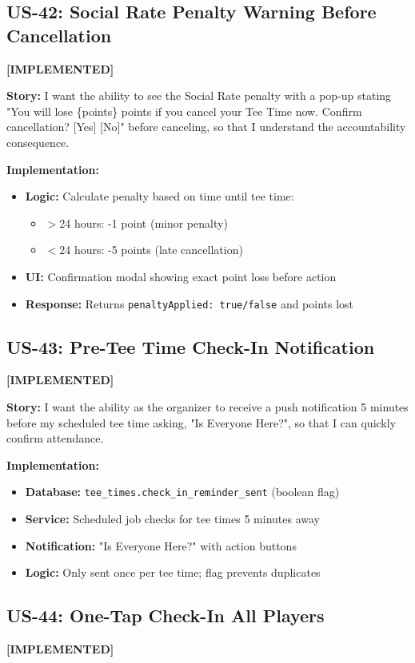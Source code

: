 \documentclass[11pt,a4paper]{article}
\newcommand{\implemented}{\textcolor{implemented}{\textbf{[IMPLEMENTED]}}}
\begin{document}
\subsection{US-42: Social Rate Penalty Warning Before Cancellation}
\implemented

\textbf{Story:} I want the ability to see the Social Rate penalty with a pop-up stating "You will lose \{points\} points if you cancel your Tee Time now. Confirm cancellation? [Yes] [No]" before canceling, so that I understand the accountability consequence.

\textbf{Implementation:}
\begin{itemize}[leftmargin=*]
  \item \textbf{Logic:} Calculate penalty based on time until tee time:
    \begin{itemize}
      \item $>$24 hours: -1 point (minor penalty)
      \item $<$24 hours: -5 points (late cancellation)
    \end{itemize}
  \item \textbf{UI:} Confirmation modal showing exact point loss before action
  \item \textbf{Response:} Returns \texttt{penaltyApplied: true/false} and points lost
\end{itemize}

\subsection{US-43: Pre-Tee Time Check-In Notification}
\implemented

\textbf{Story:} I want the ability as the organizer to receive a push notification 5 minutes before my scheduled tee time asking, "Is Everyone Here?", so that I can quickly confirm attendance.

\textbf{Implementation:}
\begin{itemize}[leftmargin=*]
  \item \textbf{Database:} \texttt{tee\_times.check\_in\_reminder\_sent} (boolean flag)
  \item \textbf{Service:} Scheduled job checks for tee times 5 minutes away
  \item \textbf{Notification:} "Is Everyone Here?" with action buttons
  \item \textbf{Logic:} Only sent once per tee time; flag prevents duplicates
\end{itemize}

\subsection{US-44: One-Tap Check-In All Players}
\implemented
\end{document}
